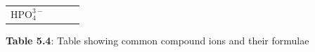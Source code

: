 {{\begin{center}
\begin{xtabular}[t]{|l|l|l|l|}
        \begin{math}\mathrm{HPO}_{4}^{3-}\end{math}%
     \tabularnewline{}
    \end{xtabular}
      \end{center}
    \begin{center}{\small\bfseries Table 5.4}: Table showing common compound ions and their formulae\end{center}
    
    \addtocounter{footnote}{-0}
    
          } %
        }{%
        }
